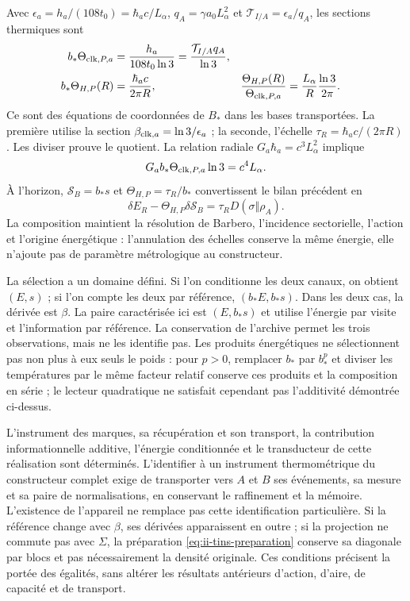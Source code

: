 Avec $\epsilon_a=h_a/(108t_0)=\hbar_ac/L_\alpha$,
$q_A=\gamma a_0L_\alpha^2$ et
$\mathcal T_{I/A}=\epsilon_a/q_A$, les sections thermiques sont
\begin{align}
 b_*\Theta_{{\rm clk},P,a}
 &=\frac{h_a}{108t_0\ln3}
 =\frac{\mathcal T_{I/A}q_A}{\ln3},\nonumber\\
 b_*\Theta_{H,P}(R)&=\frac{\hbar_ac}{2\pi R},&
 \frac{\Theta_{H,P}(R)}{\Theta_{{\rm clk},P,a}}
 &=\frac{L_\alpha}{R}\frac{\ln3}{2\pi}.
 \label{eq:ii-tins-action-area}
\end{align}
Ce sont des équations de coordonnées de $B_*$ dans les bases transportées.
La première utilise la section $\beta_{{\rm clk},a}=\ln3/\epsilon_a$ ;
la seconde, l’échelle $\tau_R=\hbar_ac/(2\pi R)$. Les diviser prouve
le quotient. La relation radiale $G_a\hbar_a=c^3L_\alpha^2$ implique
\begin{equation}
 G_ab_*\Theta_{{\rm clk},P,a}\ln3=c^4L_\alpha.
 \label{eq:ii-tins-gravity}
\end{equation}
À l’horizon, $\mathcal S_B=b_*s$ et
$\Theta_{H,P}=\tau_R/b_*$ convertissent le bilan précédent en
\[
 \delta E_R-\Theta_{H,P}\delta\mathcal S_B
 =\tau_RD(\sigma\Vert\rho_A).
\]
La composition maintient la résolution de Barbero, l’incidence sectorielle,
l’action et l’origine énergétique : l’annulation des échelles conserve la
même énergie, elle n’ajoute pas de paramètre métrologique au constructeur.

La sélection a un domaine défini. Si l’on conditionne les deux canaux,
on obtient $(E,s)$ ; si l’on compte les deux par référence, $(b_*E,b_*s)$.
Dans les deux cas, la dérivée est $\beta$. La paire caractérisée ici est
$(E,b_*s)$ et utilise l’énergie par visite et l’information par référence.
La conservation de l’archive permet les trois observations, mais ne les
identifie pas. Les produits énergétiques ne sélectionnent pas non plus à eux seuls le poids :
pour $p>0$, remplacer $b_*$ par $b_*^p$ et diviser les températures par
le même facteur relatif conserve ces produits et la composition en série ;
le lecteur quadratique ne satisfait cependant pas l’additivité démontrée ci-dessus.

L’instrument des marques, sa récupération et son
transport, la contribution informationnelle additive, l’énergie conditionnée
et le transducteur de cette réalisation sont déterminés. L’identifier à un instrument
thermométrique du constructeur complet exige de transporter vers $A$ et $B$
ses événements, sa mesure et sa paire de normalisations, en conservant le
raffinement et la mémoire. L’existence de l’appareil ne remplace pas cette
identification particulière. Si la référence change avec $\beta$, ses dérivées
apparaissent en outre ; si la projection ne commute pas avec $\Sigma$, la préparation
\eqref{eq:ii-tins-preparation} conserve sa diagonale par blocs et pas
nécessairement la densité originale. Ces conditions précisent la portée
des égalités, sans altérer les résultats antérieurs d’action, d’aire,
de capacité et de transport.
